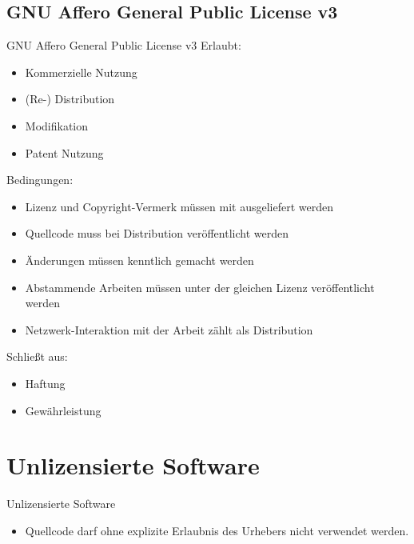 \documentclass{beamer}
\begin{document}
\subsection{GNU Affero General Public License v3}
\begin{frame}{GNU Affero General Public License v3}
	Erlaubt:
	\begin{itemize}
		\item Kommerzielle Nutzung
		\item (Re-) Distribution
		\item Modifikation
		\item Patent Nutzung
	\end{itemize}

	Bedingungen:
	\begin{itemize}
		\item Lizenz und Copyright-Vermerk müssen mit ausgeliefert werden
		\item Quellcode muss bei Distribution veröffentlicht werden
		\item Änderungen müssen kenntlich gemacht werden
		\item Abstammende Arbeiten müssen unter der gleichen
			Lizenz veröffentlicht werden
		\item Netzwerk-Interaktion mit der Arbeit zählt als Distribution
	\end{itemize}

	Schließt aus:
	\begin{itemize}
		\item Haftung
		\item Gewährleistung
	\end{itemize}
\end{frame}

\section{Unlizensierte Software}
\begin{frame}{Unlizensierte Software}
	\begin{itemize}
		\item Quellcode darf ohne explizite Erlaubnis des Urhebers nicht verwendet werden.
	\end{itemize}
\end{frame}
\end{document}

